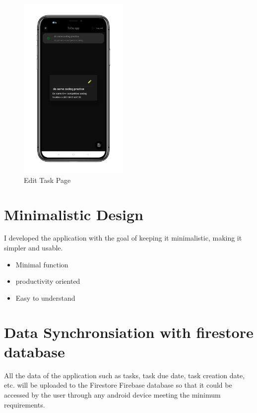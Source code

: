 \begin{figure}[h]
  \begin{center}
   \includegraphics[height=90mm]{Images & Logos/theme/CH_08_Dark_5.png}
  \end{center}
  \caption{Edit Task Page}
\end{figure}  

\section{Minimalistic Design}
I developed the application with the goal of keeping it minimalistic, making it simpler and usable.
\begin{itemize}
\item Minimal function
\item productivity oriented
\item Easy to understand
\end{itemize}

\section{Data Synchronsiation with firestore database}
All the data of the application such as tasks, task due date, task creation date, etc. will be uploaded to the Firestore Firebase database so that it could be accessed by the user through any android device meeting the minimum requirements.\\

